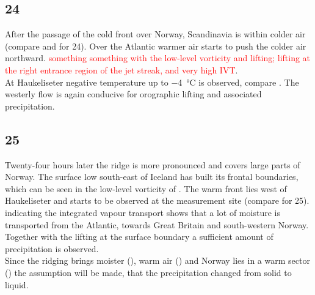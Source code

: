 \subsection*{\SI{24}{\dec}}
\noindent After the passage of the cold front over Norway, Scandinavia is within colder air (compare  and  for \SI{24}{\dec}). Over the Atlantic warmer air starts to push the colder air northward. \textcolor{red}{something something with the low-level vorticity and lifting; lifting at the right entrance region of the jet streak, and very high IVT}.
\\
At Haukeliseter negative temperature up to \SI{-4}{\celsius} is observed, compare . The westerly flow is again conducive for orographic lifting and associated precipitation.

\subsection*{\SI{25}{\dec}}
\noindent Twenty-four hours later the ridge is more pronounced and covers large parts of Norway. The surface low south-east of Iceland has built its frontal boundaries, which can be seen in the low-level vorticity of . The warm front lies west of Haukeliseter and starts to be observed at the measurement site (compare  for \SI{25}{\dec}).  indicating the integrated vapour transport shows that a lot of moisture is transported from the Atlantic, towards Great Britain and south-western Norway. Together with the lifting at the surface boundary a sufficient amount of precipitation is observed. 
\\
Since the ridging brings moister (), warm air () and Norway lies in a warm sector () the assumption will be made, that the precipitation changed from solid to liquid. 

